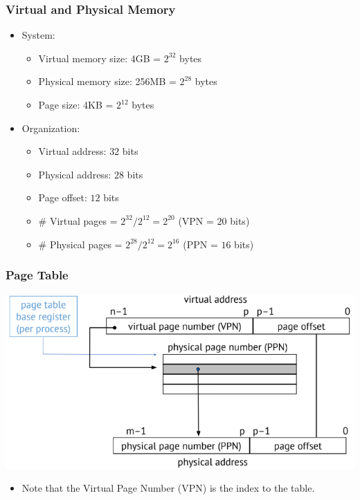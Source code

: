 \documentclass[10pt]{article}
\begin{document}
\subsubsection*{Virtual and Physical Memory}
\begin{itemize}
    \item System:
    \begin{itemize}
        \item Virtual memory size: 4GB = $2^{32}$ bytes
        \item Physical memory size: 256MB = $2^{28}$ bytes
        \item Page size: 4KB = $2^{12}$ bytes
    \end{itemize}
    \item Organization:
    \begin{itemize}
        \item Virtual address: $32$ bits
        \item Physical address: $28$ bits
        \item Page offset: $12$ bits
        \item \# Virtual pages = $2^{32} / 2^{12} = 2^{20}$ (VPN = $20$ bits)
        \item \# Physical pages = $2^{28} / 2^{12} = 2^{16}$ (PPN = $16$ bits)
    \end{itemize}
\end{itemize}
\subsubsection*{Page Table}
\begin{center}
    \includegraphics*[scale=0.8]{W7_13.png}
\end{center}
\begin{itemize}
    \item Note that the Virtual Page Number (VPN) is the index to the table.
\end{itemize}
\end{document}
